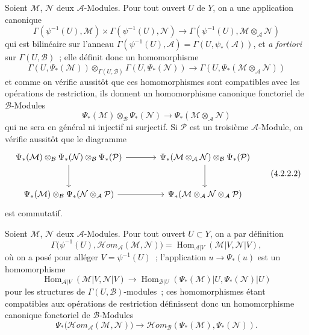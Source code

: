 \begin{env}[4.2.2]
\label{0.4.2.2-fr}
Soient $\mathcal{M}$, $\mathcal{N}$ deux $\mathcal{A}$-Modules. Pour tout
ouvert $U$ de $Y$, on a une application canonique
\[
  \Gamma(\psi^{-1}(U),\mathcal{M})
  \times\Gamma(\psi^{-1}(U),\mathcal{N})
  \longrightarrow
  \Gamma(\psi^{-1}(U),\mathcal{M}\otimes_{\mathcal{A}}\mathcal{N})
\]
qui est bilinéaire sur l'anneau
$\Gamma(\psi^{-1}(U),\mathcal{A})=\Gamma(U,\psi_*(\mathcal{A}))$, et
\emph{a fortiori} sur $\Gamma(U,\mathcal{B})$~; elle définit donc un
homomorphisme
\[
  \Gamma(U,\Psi_*(\mathcal{M}))
  \otimes_{\Gamma(U,\mathcal{B})}
  \Gamma(U,\Psi_*(\mathcal{N}))
  \longrightarrow
  \Gamma(U,\Psi_*(\mathcal{M}\otimes_{\mathcal{A}}\mathcal{N}))
\]
et comme on vérifie aussitôt que ces homomorphismes sont compatibles avec les
opérations de restriction, ils donnent un homomorphisme canonique fonctoriel
de $\mathcal{B}$-Modules
\[
  \Psi_*(\mathcal{M})\otimes_{\mathcal{B}}\Psi_*(\mathcal{N})
  \longrightarrow
  \Psi_*(\mathcal{M}\otimes_{\mathcal{A}}\mathcal{N})
  \tag{4.2.2.1}\label{0.4.2.2.1-fr}
\]
qui ne sera en général ni injectif ni surjectif. Si $\mathcal{P}$ est un
troisième $\mathcal{A}$-Module, on vérifie aussitôt que le diagramme
\[
\begin{tikzcd}[column sep=large,row sep=large]
\Psi_*(\mathcal{M})\otimes_{\mathcal{B}}\Psi_*(\mathcal{N})
  \otimes_{\mathcal{B}}\Psi_*(\mathcal{P})
  \arrow[r]
  \arrow[d]
&
\Psi_*(\mathcal{M}\otimes_{\mathcal{A}}\mathcal{N})
  \otimes_{\mathcal{B}}\Psi_*(\mathcal{P})
  \arrow[d]
\\
\Psi_*(\mathcal{M})\otimes_{\mathcal{B}}
  \Psi_*(\mathcal{N}\otimes_{\mathcal{A}}\mathcal{P})
  \arrow[r]
&
\Psi_*(\mathcal{M}\otimes_{\mathcal{A}}\mathcal{N}
  \otimes_{\mathcal{A}}\mathcal{P})
\end{tikzcd}
\tag{4.2.2.2}\label{0.4.2.2.2-fr}
\]
est commutatif.
\end{env}

\begin{env}[4.2.3]
\label{0.4.2.3-fr}
Soient $\mathcal{M}$, $\mathcal{N}$ deux $\mathcal{A}$-Modules. Pour tout
ouvert $U\subset Y$, on a par définition
\[
  \Gamma\bigl(\psi^{-1}(U),
    \mathcal{H}\!om_{\mathcal{A}}(\mathcal{M},\mathcal{N})\bigr)
  =
  \operatorname{Hom}_{\mathcal{A}|V}
    (\mathcal{M}|V,\mathcal{N}|V),
\]
où on a posé pour alléger $V=\psi^{-1}(U)$~; l'application
$u\to\Psi_*(u)$ est un homomorphisme
\[
  \operatorname{Hom}_{\mathcal{A}|V}(\mathcal{M}|V,\mathcal{N}|V)
  \longrightarrow
  \operatorname{Hom}_{\mathcal{B}|U}
    (\Psi_*(\mathcal{M})|U,\Psi_*(\mathcal{N})|U)
\]
pour les structures de $\Gamma(U,\mathcal{B})$-modules~; ces homomorphismes
étant compatibles aux opérations de restriction définissent donc un
homomorphisme canonique fonctoriel de $\mathcal{B}$-Modules
\[
  \Psi_*\bigl(\mathcal{H}\!om_{\mathcal{A}}(\mathcal{M},\mathcal{N})\bigr)
  \longrightarrow
  \mathcal{H}\!om_{\mathcal{B}}
    (\Psi_*(\mathcal{M}),\Psi_*(\mathcal{N})).
  \tag{4.2.3.1}\label{0.4.2.3.1-fr}
\]
\end{env}

